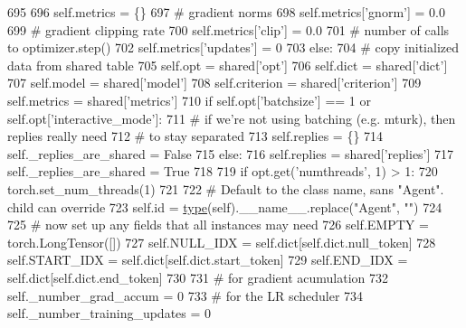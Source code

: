 \begin{DoxyCode}
695 
696             self.metrics = \{\}
697             \textcolor{comment}{# gradient norms}
698             self.metrics[\textcolor{stringliteral}{'gnorm'}] = 0.0
699             \textcolor{comment}{# gradient clipping rate}
700             self.metrics[\textcolor{stringliteral}{'clip'}] = 0.0
701             \textcolor{comment}{# number of calls to optimizer.step()}
702             self.metrics[\textcolor{stringliteral}{'updates'}] = 0
703         \textcolor{keywordflow}{else}:
704             \textcolor{comment}{# copy initialized data from shared table}
705             self.opt = shared[\textcolor{stringliteral}{'opt'}]
706             self.dict = shared[\textcolor{stringliteral}{'dict'}]
707             self.model = shared[\textcolor{stringliteral}{'model'}]
708             self.criterion = shared[\textcolor{stringliteral}{'criterion'}]
709             self.metrics = shared[\textcolor{stringliteral}{'metrics'}]
710             \textcolor{keywordflow}{if} self.opt[\textcolor{stringliteral}{'batchsize'}] == 1 \textcolor{keywordflow}{or} self.opt[\textcolor{stringliteral}{'interactive\_mode'}]:
711                 \textcolor{comment}{# if we're not using batching (e.g. mturk), then replies really need}
712                 \textcolor{comment}{# to stay separated}
713                 self.replies = \{\}
714                 self.\_replies\_are\_shared = \textcolor{keyword}{False}
715             \textcolor{keywordflow}{else}:
716                 self.replies = shared[\textcolor{stringliteral}{'replies'}]
717                 self.\_replies\_are\_shared = \textcolor{keyword}{True}
718 
719         \textcolor{keywordflow}{if} opt.get(\textcolor{stringliteral}{'numthreads'}, 1) > 1:
720             torch.set\_num\_threads(1)
721 
722         \textcolor{comment}{# Default to the class name, sans "Agent". child can override}
723         self.id = \hyperlink{namespaceparlai_1_1agents_1_1tfidf__retriever_1_1build__tfidf_ad5dfae268e23f506da084a9efb72f619}{type}(self).\_\_name\_\_.replace(\textcolor{stringliteral}{"Agent"}, \textcolor{stringliteral}{""})
724 
725         \textcolor{comment}{# now set up any fields that all instances may need}
726         self.EMPTY = torch.LongTensor([])
727         self.NULL\_IDX = self.dict[self.dict.null\_token]
728         self.START\_IDX = self.dict[self.dict.start\_token]
729         self.END\_IDX = self.dict[self.dict.end\_token]
730 
731         \textcolor{comment}{# for gradient acumulation}
732         self.\_number\_grad\_accum = 0
733         \textcolor{comment}{# for the LR scheduler}
734         self.\_number\_training\_updates = 0

\end{DoxyCode}
